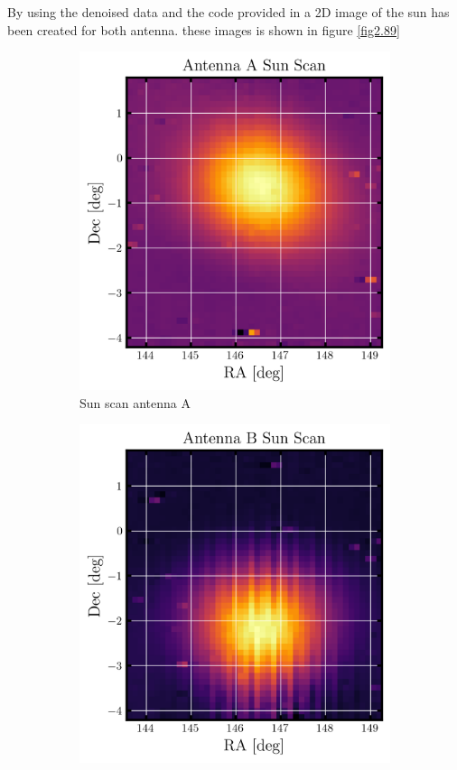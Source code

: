 \documentclass[12pt]{article}
\begin{document}
 By using the denoised data and the code provided in \parencite{lecturenote} a 2D image of the sun has been created for both antenna. these images is shown in figure \ref{fig2.89} 
 \begin{figure}[H]
     \centering
     \begin{subfigure}{.45\textwidth}
         \centering
         \includegraphics[width=\textwidth]{fig/7.AntennaAscan.png}
         \caption{Sun scan antenna A}
         \label{fig2.8}
     \end{subfigure}
     \hfill
     \begin{subfigure}{.45\textwidth}
         \centering
         \includegraphics[width=\textwidth]{fig/8.AntennaBscan.png}

\end{subfigure}
\end{figure}
\end{document}

